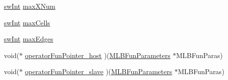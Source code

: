\begin{DoxyCompactItemize}
\item 
\hyperlink{swMacro_8h_a113cf5f6b5377cdf3fac6aa4e443e9aa}{swInt} \hyperlink{structMLBParameters_a2d2166d1e3bd56f2265645cc826996dc}{maxXNum}
\item 
\hyperlink{swMacro_8h_a113cf5f6b5377cdf3fac6aa4e443e9aa}{swInt} \hyperlink{structMLBParameters_aace8685526e0a7bc2da72db8e6f9b02c}{maxCells}
\item 
\hyperlink{swMacro_8h_a113cf5f6b5377cdf3fac6aa4e443e9aa}{swInt} \hyperlink{structMLBParameters_ad053997c6c3dfbcb0b342e7a2b2c892e}{maxEdges}
\item 
void($\ast$ \hyperlink{structMLBParameters_ad7a8768b3710ff857ab156bf24db6548}{operatorFunPointer\_\-host} )(\hyperlink{structMLBFunParameters}{MLBFunParameters} $\ast$MLBFunParas)
\item 
void($\ast$ \hyperlink{structMLBParameters_aec73e8d9f7b561d3a80658ee8a3eb397}{operatorFunPointer\_\-slave} )(\hyperlink{structMLBFunParameters}{MLBFunParameters} $\ast$MLBFunParas)
\end{DoxyCompactItemize}


